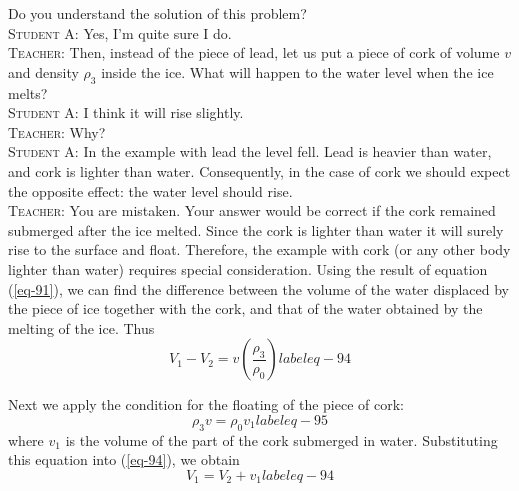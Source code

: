 \documentclass[a4paper,sfsidenotes]{tufte-book}
\begin{document}
Do you understand the solution of this problem?
\\
\textsc{Student A:} Yes, I'm quite sure I do.
\\
\textsc{Teacher:} Then, instead of the piece of lead, let us put a piece of cork of volume $v$ and density $\rho_{3}$ inside the ice. What will happen to the water level when the ice melts?
\\
\textsc{Student A:} I think it will rise slightly.
\\
\textsc{Teacher:} Why?
\\
\textsc{Student A:} In the example with lead the level fell. Lead is heavier than water, and cork is lighter than water. Consequently, in the case of cork we should expect the opposite effect: the water level should rise.
\\
\textsc{Teacher:} You are mistaken. Your answer would be correct if the cork remained submerged after the ice melted. Since the cork is lighter than water it will surely rise to the surface and float. Therefore, the example with cork (or any other body lighter than water) requires special consideration. Using the
result of equation (\ref{eq-91}), we can find the difference between the volume of the water displaced by the piece of ice together with the cork, and that of the water obtained by the melting of the ice. Thus
\begin{equation}%
V_{1} - V_{2} = v \left( \frac{\rho_{3}}{\rho_{0}} \right)
label{eq-94}
\end{equation}

Next we apply the condition for the floating of the piece of cork:
\begin{equation}%
\rho_{3}v  = \rho_{0}v_{1}
label{eq-95}
\end{equation}
where $v_{1}$ is the volume of the part of the cork submerged in water. Substituting this equation into (\ref{eq-94}), we obtain
\begin{equation}%
V_{1} = V_{2} +v_{1}
label{eq-94}
\end{equation}
\end{document}

